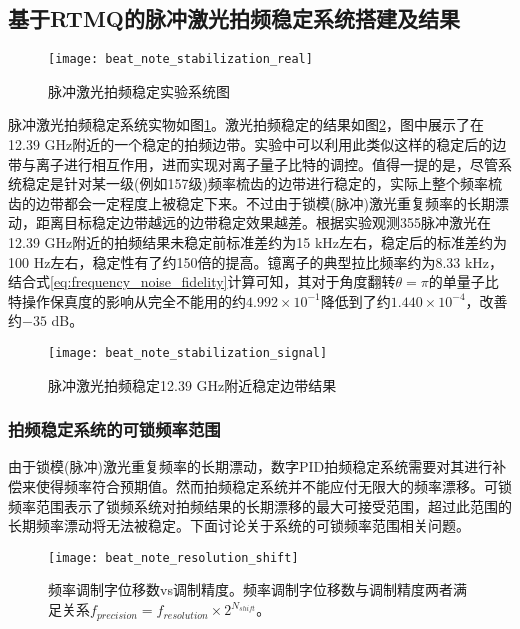 \subsection[基于RTMQ的脉冲激光拍频稳定系统搭建及结果]{基于RTMQ的脉冲激光拍频稳定系统搭建及结果}


\begin{figure}
    \centering
    \texttt{[image: beat\_note\_stabilization\_real]}
    \caption[脉冲激光拍频稳定实验系统图]{脉冲激光拍频稳定实验系统图\label{fig:beat_note_stabilization_real}}
\end{figure}

脉冲激光拍频稳定系统实物如图\ref{fig:beat_note_stabilization_real}。激光拍频稳定的结果如图\ref{fig:beat_note_stabilization_signal}，图中展示了在12.39 GHz附近的一个稳定的拍频边带。实验中可以利用此类似这样的稳定后的边带与离子进行相互作用，进而实现对离子量子比特的调控。值得一提的是，尽管系统稳定是针对某一级(例如157级)频率梳齿的边带进行稳定的，实际上整个频率梳齿的边带都会一定程度上被稳定下来。不过由于锁模(脉冲)激光重复频率的长期漂动，距离目标稳定边带越远的边带稳定效果越差。根据实验观测355脉冲激光在12.39 GHz附近的拍频结果未稳定前标准差约为15 kHz左右，稳定后的标准差约为100 Hz左右，稳定性有了约150倍的提高。镱离子的典型拉比频率约为8.33 kHz，结合式\eqref{eq:frequency_noise_fidelity}计算可知，其对于角度翻转$\theta=\pi$的单量子比特操作保真度的影响从完全不能用的约$4.992\times 10^{-1}$降低到了约$1.440\times 10^{-4}$，改善约$-35$ dB。


\begin{figure}
    \centering
    \texttt{[image: beat\_note\_stabilization\_signal]}
    \caption[脉冲激光拍频稳定12.39 GHz附近稳定边带结果]{脉冲激光拍频稳定12.39 GHz附近稳定边带结果\label{fig:beat_note_stabilization_signal}}
\end{figure}

\subsubsection[拍频稳定系统的可锁频率范围]{拍频稳定系统的可锁频率范围}
由于锁模(脉冲)激光重复频率的长期漂动，数字PID拍频稳定系统需要对其进行补偿来使得频率符合预期值。然而拍频稳定系统并不能应付无限大的频率漂移。可锁频率范围表示了锁频系统对拍频结果的长期漂移的最大可接受范围，超过此范围的长期频率漂动将无法被稳定。下面讨论关于系统的可锁频率范围相关问题。

\begin{figure}
    \centering
    \texttt{[image: beat\_note\_resolution\_shift]}
    \caption[频率调制字位移数vs调制精度
    ]{频率调制字位移数vs调制精度。频率调制字位移数与调制精度两者满足关系$f_{precision}=f_{resolution}\times2^{N_{shift}}$。
    \label{fig:beat_note_resolution_shift}}
\end{figure}

